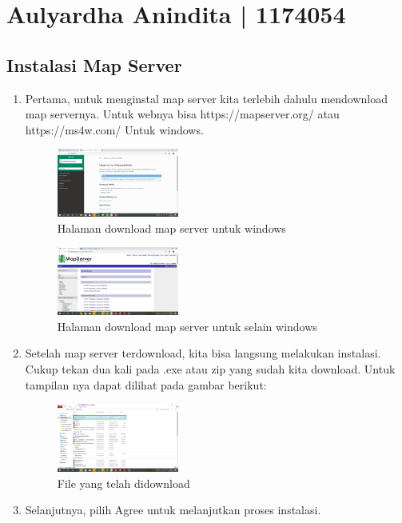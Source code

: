 \section{Aulyardha Anindita | 1174054}
\subsection{Instalasi Map Server}
\begin{enumerate}
	\item Pertama, untuk menginstal map server kita terlebih dahulu mendownload map servernya. Untuk webnya bisa https://mapserver.org/ atau https://ms4w.com/ Untuk windows.
    \hfill\break
    \begin{figure}[H]
		\includegraphics[width=4cm]{figures/tugas4/1174054/1.png}
		\centering
		\caption{Halaman download map server untuk windows}
    \end{figure}
    \hfill\break
    \begin{figure}[H]
		\includegraphics[width=4cm]{figures/tugas4/1174054/2.png}
		\centering
		\caption{Halaman download map server untuk selain windows}
    \end{figure}
    \item Setelah map server terdownload, kita bisa langsung melakukan instalasi. Cukup tekan dua kali pada .exe atau zip yang sudah kita download. Untuk tampilan nya dapat dilihat pada gambar berikut:
    \hfill\break
    \begin{figure}[H]
		\includegraphics[width=4cm]{figures/tugas4/1174054/3.png}
		\centering
		\caption{File yang telah didownload}
    \end{figure}
    \hfill\break
    \item Selanjutnya, pilih Agree untuk melanjutkan proses instalasi. 

\end{enumerate}
